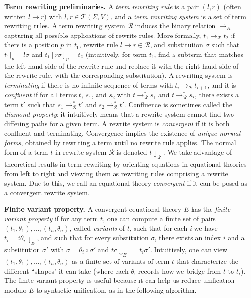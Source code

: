 \documentclass{article}
\theoremstyle{definition}
\begin{document}
\textbf{Term rewriting preliminaries.}  A \emph{term rewriting rule} is a pair $(l, r)$ (often written $l \rightarrow r$) with $l, r \in \mathcal{T}(\Sigma, V)$, and a \emph{term rewriting system} is a set of term rewriting rules. A term rewriting system $\mathcal{R}$ induces the binary relation $\rightarrow_R$ capturing all possible applications of rewrite rules. More formally, $t_1 \rightarrow_{\mathcal{R}} t_2$ if there is a position $p$ in $t_1$, rewrite rule $l \rightarrow r \in \mathcal{R}$, and substitution $\sigma$ such that $t_1|_p = l\sigma$ and $t_1[r \sigma]_p = t_2$ (intuitively, for term $t_1$, find a subterm that matches the left-hand side of the rewrite rule and replace it with the right-hand side of the rewrite rule, with the corresponding substitution). A rewriting system is \emph{terminating} if there is no infinite sequence of terms with $t_i \rightarrow_{\mathcal{R}} t_{i+1}$, and it is \emph{confluent} if for all terms $t$, $s_1$, and $s_2$ with $t \rightarrow_{\mathcal{R}}^* s_1$ and $t \rightarrow_{\mathcal{R}}^* s_2$, there exists a term $t'$ such that $s_1 \rightarrow_{\mathcal{R}}^* t'$ and $s_2 \rightarrow_{\mathcal{R}}^* t'$. Confluence is sometimes called the \emph{diamond property}; it intuitively means that a rewrite system cannot find two differing paths for a given term. A rewrite system is \emph{convergent} if it is both confluent and terminating. Convergence implies the existence of \emph{unique normal forms}, obtained by rewriting a term until no rewrite rule applies. The normal form of a term $t$ in rewrite system $\mathcal{R}$ is denoted $t\!\downarrow_{\mathcal{R}}$.
We take advantage of theoretical results in term rewriting by orienting equations in equational theories from left to right and viewing them as rewriting rules comprising a rewrite system.
Due to this, we call an equational theory  \emph{convergent} if it can be posed as a convergent rewrite system.

\textbf{Finite variant property.}
A convergent equational theory $E$ has the \emph{finite variant property} \cite{fvp} 
if for any term $t$, one can compute a finite set of pairs $(t_1,\theta_1),\dots,(t_n,\theta_n)$, called \emph{variants} of $t$, such that for each $i$ we have
$t_i = t\theta_i\!\downarrow_E$, and such that for every substitution $\sigma$, there exists an index $i$ and a substitution $\sigma'$ with
$\sigma = \theta_i \circ \sigma'$ and $t\sigma\!\downarrow_E\; = t_i\sigma'$.
Intuitively, one can view $(t_1, \theta_1), \dots, (t_n, \theta_n)$ as a finite set of variants of term $t$ 
that characterize the different ``shapes" it can take (where each $\theta_i$ records how we bridge from $t$ to $t_i$). 
The finite variant property is useful because it can help us reduce unification modulo $E$ to syntactic unification, 
as in the following algorithm.
\end{document}
